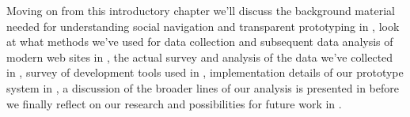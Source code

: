 Moving on from this introductory chapter we'll discuss the background
material needed for understanding social navigation and transparent
prototyping in ,
look at what methods we've used for data collection and subsequent data
analysis of modern web sites
in ,
the actual survey and analysis of the data we've collected in
,
survey of development tools used in
,
implementation details of our prototype system in
,
a discussion of the broader lines of our analysis is presented in
before we finally reflect on our research and possibilities for future work
in .
